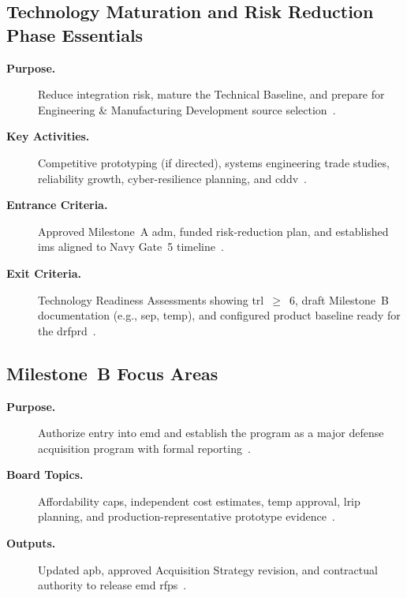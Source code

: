 \documentclass[../main.tex]{subfiles}
\begin{document}
\subsection{Technology Maturation and Risk Reduction Phase Essentials}
\begin{description}
  \item[\textbf{Purpose.}] Reduce integration risk, mature the Technical Baseline, and prepare for Engineering \& Manufacturing Development source selection~\autocite{DoDI5000-85}.
  \item[\textbf{Key Activities.}] Competitive prototyping (if directed), systems engineering trade studies, reliability growth, cyber-resilience planning, and \ac{cddv}~\autocite{DoDI5000-85}.
  \item[\textbf{Entrance Criteria.}] Approved Milestone~A \ac{adm}, funded risk-reduction plan, and established \ac{ims} aligned to Navy Gate~5 timeline~\autocite{DoDI5000-85,OPNAVINST5000-42E}.
  \item[\textbf{Exit Criteria.}] Technology Readiness Assessments showing \ac{trl}~$\geq$~6, draft Milestone~B documentation (e.g., \ac{sep}, \ac{temp}), and configured product baseline ready for the \ac{drfprd}~\autocite{DoDI5000-85}.
\end{description}

\subsection{Milestone~B Focus Areas}
\begin{description}
  \item[\textbf{Purpose.}] Authorize entry into \ac{emd} and establish the program as a major defense acquisition program with formal reporting~\autocite{DoDI5000-85}.
  \item[\textbf{Board Topics.}] Affordability caps, independent cost estimates, \ac{temp} approval, \ac{lrip} planning, and production-representative prototype evidence~\autocite{DoDI5000-85}.
  \item[\textbf{Outputs.}] Updated \ac{apb}, approved Acquisition Strategy revision, and contractual authority to release \ac{emd} \glspl{rfp}~\autocite{DoDI5000-85}.
\end{description}
\end{document}
